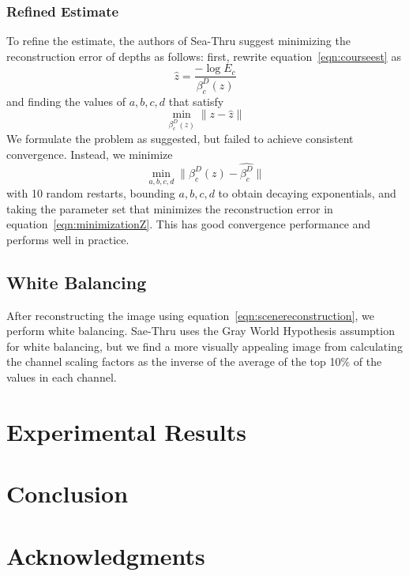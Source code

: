 \documentclass[10pt,twocolumn,letterpaper]{article}
\begin{document}
\subsubsection*{Refined Estimate}
To refine the estimate, the authors of Sea-Thru suggest minimizing the reconstruction error of depths as follows:
first, rewrite equation~\ref{eqn:courseest} as
\begin{equation}
\label{eqn:reconstructedz}
    \hat{z} = \frac{-\log{E_c}}{\beta_c^D(z)}
\end{equation}
and finding the values of $a, b, c, d$ that satisfy
\begin{equation}
\label{eqn:minimizationZ}
    \min_{\beta_c^D(z)} \lVert z - \hat{z} \rVert
\end{equation}
We formulate the problem as suggested, but failed to achieve consistent convergence. Instead, we minimize
\begin{equation}
\label{eqn:minimizationB}
    \min_{a,b,c,d} \lVert \beta_c^D(z) - \hat{\beta_c^D} \rVert
\end{equation}
with 10 random restarts, bounding $a,b,c,d$ to obtain decaying exponentials, and taking the parameter set that
minimizes the reconstruction error in equation~\ref{eqn:minimizationZ}. This has good convergence performance
and performs well in practice.

\subsection{White Balancing}
After reconstructing the image using equation~\ref{eqn:scenereconstruction}, we perform white balancing.
Sae-Thru uses the Gray World Hypothesis assumption for white balancing, but we find a more visually appealing
image from calculating the channel scaling factors as the inverse of the average of the top 10\% of the values
in each channel.

\section{Experimental Results}

\section{Conclusion}

\section*{Acknowledgments}

{\small

}
\end{document}
